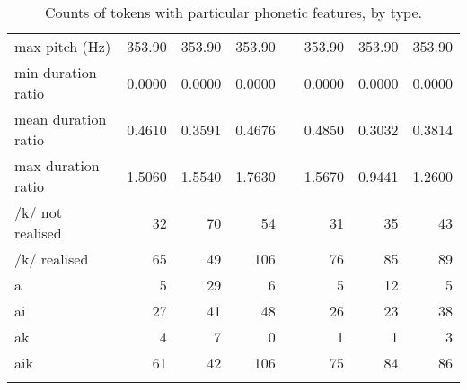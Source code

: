 \begin{table}[htbp]
{\begin{tabular}{>{\raggedright}p{3.33cm}d{4}d{4}d{4}cd{4}d{4}d{4}}
  max pitch (Hz) &  353.90  &  353.90  & 353.90 & & 353.90  & 353.90 & 353.90  \\
  min duration ratio &  0.0000 & 0.0000 & 0.0000 & & 0.0000 & 0.0000 & 0.0000  \\
  mean duration ratio &  0.4610 & 0.3591 & 0.4676 & & 0.4850 & 0.3032 & 0.3814 \\
  max duration ratio &  1.5060 & 1.5540  & 1.7630 & & 1.5670  & 0.9441 & 1.2600 \\
  /k/ not realised & 32 & 70 &  54 & & 31 & 35 & 43 \\
  /k/ realised &  65 & 49 & 106 & & 76 & 85 & 89 \\
  a & 5 & 29 & 6 & & 5 & 12 & 5 \\
  ai & 27 & 41 & 48 & & 26 & 23 & 38 \\
  ak & 4 & 7 & 0 & & 1 & 1 & 3 \\
  aik & 61 & 42 & 106 & & 75 & 84 & 86\\
  
  \lspbottomrule
  
  \end{tabular}
}
\caption{Counts of tokens with particular phonetic features, by type.}\label{tab:appenprodfeatures} 
\end{table}